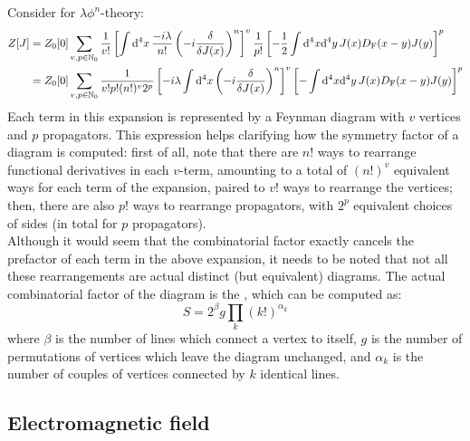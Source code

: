 Consider  for $ \lambda \phi^n $-theory:
\begin{equation*}
  \begin{split}
    Z[J]
    & = Z_0[0] \sum_{v,p \in \mathbb{N}_0} \frac{1}{v!} \left[ \int \mathrm{d}^4x\, \frac{-i \lambda}{n!} \left( -i \frac{\delta}{\delta J(x)} \right)^n \right]^v \frac{1}{p!} \left[ - \frac{1}{2} \int \mathrm{d}^4x \mathrm{d}^4y\, J(x) D_\text{F}(x-y) J(y) \right]^p \\
    & = Z_0[0] \sum_{v,p \in \mathbb{N}_0} \frac{1}{v! p! (n!)^v 2^p} \left[ - i \lambda \int \mathrm{d}^4x \left( -i \frac{\delta}{\delta J(x)} \right)^n \right]^v \left[ - \int \mathrm{d}^4x \mathrm{d}^4y\, J(x) D_\text{F}(x-y) J(y) \right]^p
  \end{split}
\end{equation*}
Each term in this expansion is represented by a Feynman diagram with $ v $ vertices and $ p $ propagators. This expression helps clarifying how the symmetry factor of a diagram is computed: first of all, note that there are $ n! $ ways to rearrange functional derivatives in each $ v $-term, amounting to a total of $ (n!)^v $ equivalent ways for each term of the expansion, paired to $ v! $ ways to rearrange the vertices; then, there are also $ p! $ ways to rearrange propagators, with $ 2^p $ equivalent choices of sides (in total for $ p $ propagators). \\
Although it would seem that the combinatorial factor exactly cancels the prefactor of each term in the above expansion, it needs to be noted that not all these rearrangements are actual distinct (but equivalent) diagrams. The actual combinatorial factor of the diagram is the , which can be computed as:
\begin{equation}
  S = 2^\beta g \prod_k (k!)^{\alpha_k}
\end{equation}
where $ \beta $ is the number of lines which connect a vertex to itself, $ g $ is the number of permutations of vertices which leave the diagram unchanged, and $ \alpha_k $ is the number of couples of vertices connected by $ k $ identical lines.

\subsection{Electromagnetic field}

